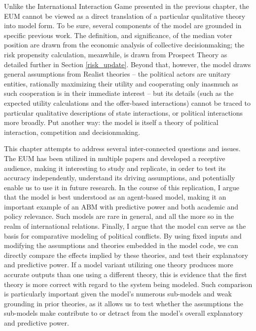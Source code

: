 Unlike the International Interaction Game presented in the previous chapter, the EUM cannot be viewed as a direct translation of a particular qualitative theory into model form. To be sure, several components of the model are grounded in specific previous work. The definition, and significance, of the median voter position are drawn from the \citet{black_1948} economic analysis of collective decisionmaking; the risk propensity calculation, meanwhile, is drawn from Prospect Theory \citep{kahneman_1984} as detailed further in Section \ref{risk_update}. Beyond that, however, the model draws general assumptions from Realist theories -- the political actors are unitary entities, rationally maximizing their utility and cooperating only inasmuch as such cooperation is in their immediate interest -- but its details (such as the expected utility calculations and the offer-based interactions) cannot be traced to particular qualitative descriptions of state interactions, or political interactions more broadly. Put another way: the model is itself a theory of political interaction, competition and decisionmaking.

This chapter attempts to address several inter-connected questions and issues. The EUM has been utilized in multiple papers and developed a receptive audience, making it interesting to study and replicate, in order to test its accuracy independently, understand its driving assumptions, and potentially enable us to use it in future research. In the course of this replication, I argue that the model is best understood as an agent-based model, making it an important example of an ABM with predictive power and both academic and policy relevance. Such models are rare in general, and all the more so in the realm of international relations. Finally, I argue that the model can serve as the basis for comparative modeling of political conflicts. By using fixed inputs and modifying the assumptions and theories embedded in the model code, we can directly compare the effects implied by these theories, and test their explanatory and predictive power. If a model variant utilizing one theory produces more accurate outputs than one using a different theory, this is evidence that the first theory is more correct with regard to the system being modeled. Such comparison is particularly important given the model's numerous sub-models and weak grounding in prior theories, as it allows us to test whether the assumptions the sub-models make contribute to or detract from the model's overall explanatory and predictive power.

